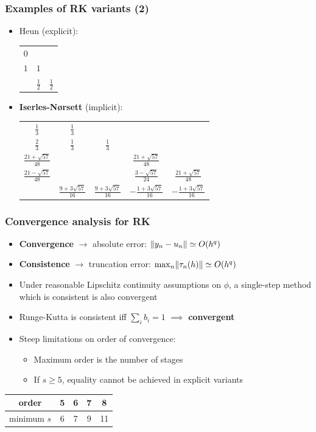 \documentclass{beamer}
\begin{document}
\begin{frame} %
	\frametitle{Examples of RK variants (2)}
	\begin{itemize}
		\item Heun (explicit):
		\begin{center}
			\begin{tabular}{c|cc}
				$0$ &     & \\
				$1$ & $1$ & \\
				\hline
				& $\frac 1 2$ & $\frac 1 2$
			\end{tabular}
		\end{center}
		\item \textbf{Iserles-Nørsett} (implicit):
		\begin{center}
			\begin{tabular}{c|cccc}
				$\frac{1}{3}$ & $\frac{1}{3}$ & & & \\
				$\frac{2}{3}$ & $\frac{1}{3}$ & $\frac{1}{3}$ & & \\
				$\frac{21+\sqrt{57}}{48}$ & & & $\frac{21+\sqrt{57}}{48}$ & \\
				$\frac{21-\sqrt{57}}{48}$ & & & $\frac{3-\sqrt{57}}{24}$ & $\frac{21+\sqrt{57}}{48}$ \\
				\hline
				& $\frac{9+3\sqrt{57}}{16}$ & $\frac{9+3\sqrt{57}}{16}$ & $-\frac{1+3\sqrt{57}}{16}$ & $-\frac{1+3\sqrt{57}}{16}$
				\end{tabular} %
		\end{center}
	\end{itemize}
\end{frame}


\begin{frame} %
\frametitle{Convergence analysis for RK}
	\begin{itemize}
		\item \textbf{Convergence} $\to$ absolute error: $\lVert y_n - u_n\rVert \simeq O(h^q)$
		\item \textbf{Consistence} $\to$ truncation error: $\max_n \lVert\tau_n(h)\rVert \simeq O(h^q)$
		\item Under reasonable Lipschitz continuity assumptions on $\phi$, a single-step method which is consistent is also convergent
		\pause
		\item Runge-Kutta is consistent iff $\sum_i b_i = 1$ $\implies$ \textbf{convergent}
		\item Steep limitations on order of convergence:
		\begin{itemize}
			\item Maximum order is the number of stages
			\item If $s \ge 5$, equality cannot be achieved in explicit variants \\[15pt]
		\end{itemize}
	\end{itemize}
	\begin{center}
		\begin{tabular}{c|cccc}
			order & 5 & 6 & 7 & 8\\
			\hline
			minimum $s$ & 6 & 7 & 9 & 11 
		\end{tabular}
	\end{center}
\end{frame}
\end{document}
